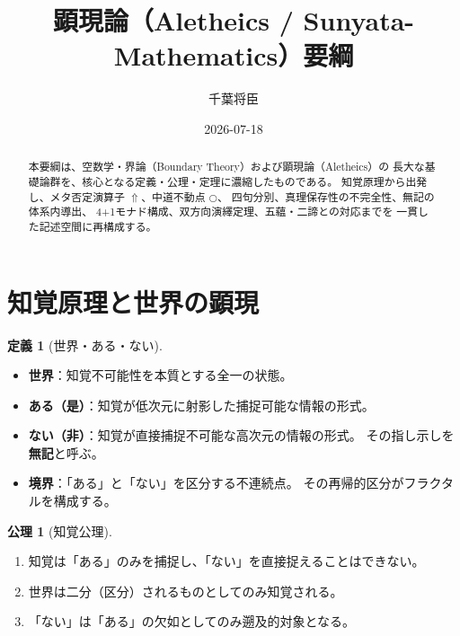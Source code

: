 \documentclass[11pt,a4paper]{ltjsarticle}
\newcommand{\metanegation}{\Uparrow}
\newcommand{\dfix}{\bigcirc}
\theoremstyle{definition}
\newtheorem{definition}{定義}[section]
\newtheorem{axiom}{公理}[section]
\begin{document}
\title{顕現論（Aletheics / Sunyata-Mathematics）要綱}
\author{千葉将臣}
\date{2026-07-18}
\maketitle

\begin{abstract}
本要綱は、空数学・界論（Boundary Theory）および顕現論（Aletheics）の
長大な基礎論群を、核心となる定義・公理・定理に濃縮したものである。
知覚原理から出発し、メタ否定演算子 $\metanegation$、中道不動点 $\dfix$、
四句分別、真理保存性の不完全性、無記の体系内導出、
4+1モナド構成、双方向演繹定理、五蘊・二諦との対応までを
一貫した記述空間に再構成する。
\end{abstract}

\tableofcontents
\newpage

\section{知覚原理と世界の顕現}

\begin{definition}[世界・ある・ない]
\leavevmode
\begin{itemize}[leftmargin=2em]
  \item \textbf{世界}：知覚不可能性を本質とする全一の状態。
  \item \textbf{ある（是）}：知覚が低次元に射影した捕捉可能な情報の形式。
  \item \textbf{ない（非）}：知覚が直接捕捉不可能な高次元の情報の形式。
    その指し示しを\textbf{無記}と呼ぶ。
  \item \textbf{境界}：「ある」と「ない」を区分する不連続点。
    その再帰的区分がフラクタルを構成する。
\end{itemize}
\end{definition}

\begin{axiom}[知覚公理]
\leavevmode
\begin{enumerate}[label=\textbf{公理 \arabic*.}, leftmargin=3em]
  \item 知覚は「ある」のみを捕捉し、「ない」を直接捉えることはできない。
  \item 世界は二分（区分）されるものとしてのみ知覚される。
  \item 「ない」は「ある」の欠如としてのみ遡及的対象となる。
\end{enumerate}
\end{axiom}
\end{document}
